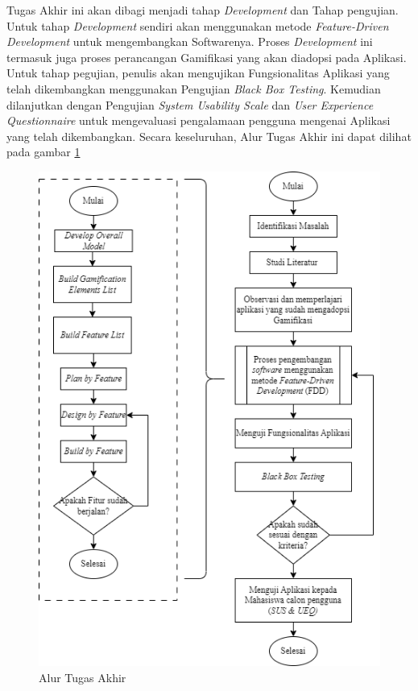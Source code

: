 Tugas Akhir ini akan dibagi menjadi tahap \textit{Development} dan Tahap pengujian.
Untuk tahap \textit{Development} sendiri akan menggunakan metode \textit{Feature-Driven Development} untuk mengembangkan Softwarenya.
Proses \textit{Development} ini termasuk juga proses perancangan Gamifikasi yang akan diadopsi pada Aplikasi.
Untuk tahap pegujian, penulis akan mengujikan Fungsionalitas Aplikasi yang telah dikembangkan menggunakan Pengujian \textit{Black Box Testing}.
Kemudian dilanjutkan dengan Pengujian \textit{System Usability Scale} dan \textit{User Experience Questionnaire} untuk mengevaluasi pengalamaan pengguna mengenai Aplikasi yang telah dikembangkan.
Secara keseluruhan, Alur Tugas Akhir ini dapat dilihat pada gambar \ref{Fig:Alur Tugas Akhir}
\begin{figure}[H]
	\centering
	\includegraphics[width=12cm]{contents/chapter-3/images/Alur-tugas-akhir.png}
	\caption[Caption]{Alur Tugas Akhir}
	\label{Fig:Alur Tugas Akhir}
\end{figure}
